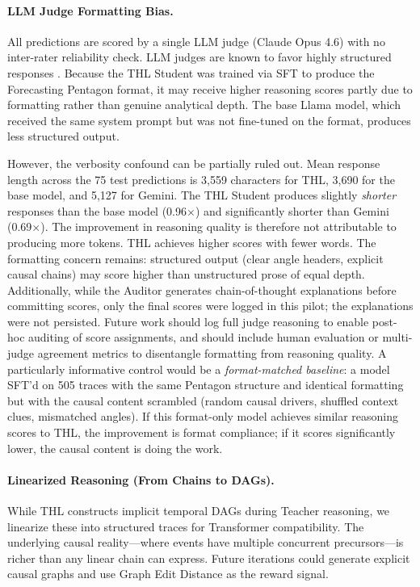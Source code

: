\documentclass[11pt,a4paper]{article}
\begin{document}
\paragraph{LLM Judge Formatting Bias.}
All predictions are scored by a single LLM judge (Claude Opus 4.6) with no inter-rater reliability check. LLM judges are known to favor highly structured responses \cite{zheng2023judging}. Because the THL Student was trained via SFT to produce the Forecasting Pentagon format, it may receive higher reasoning scores partly due to formatting rather than genuine analytical depth. The base Llama model, which received the same system prompt but was not fine-tuned on the format, produces less structured output.

However, the verbosity confound can be partially ruled out. Mean response length across the 75 test predictions is 3,559 characters for THL, 3,690 for the base model, and 5,127 for Gemini. The THL Student produces slightly \emph{shorter} responses than the base model (0.96$\times$) and significantly shorter than Gemini (0.69$\times$). The improvement in reasoning quality is therefore not attributable to producing more tokens. THL achieves higher scores with fewer words. The formatting concern remains: structured output (clear angle headers, explicit causal chains) may score higher than unstructured prose of equal depth. Additionally, while the Auditor generates chain-of-thought explanations before committing scores, only the final scores were logged in this pilot; the explanations were not persisted. Future work should log full judge reasoning to enable post-hoc auditing of score assignments, and should include human evaluation or multi-judge agreement metrics to disentangle formatting from reasoning quality. A particularly informative control would be a \emph{format-matched baseline}: a model SFT'd on 505 traces with the same Pentagon structure and identical formatting but with the causal content scrambled (random causal drivers, shuffled context clues, mismatched angles). If this format-only model achieves similar reasoning scores to THL, the improvement is format compliance; if it scores significantly lower, the causal content is doing the work.

\paragraph{Linearized Reasoning (From Chains to DAGs).}
While THL constructs implicit temporal DAGs during Teacher reasoning, we linearize these into structured traces for Transformer compatibility. The underlying causal reality---where events have multiple concurrent precursors---is richer than any linear chain can express. Future iterations could generate explicit causal graphs and use Graph Edit Distance as the reward signal.
\end{document}
